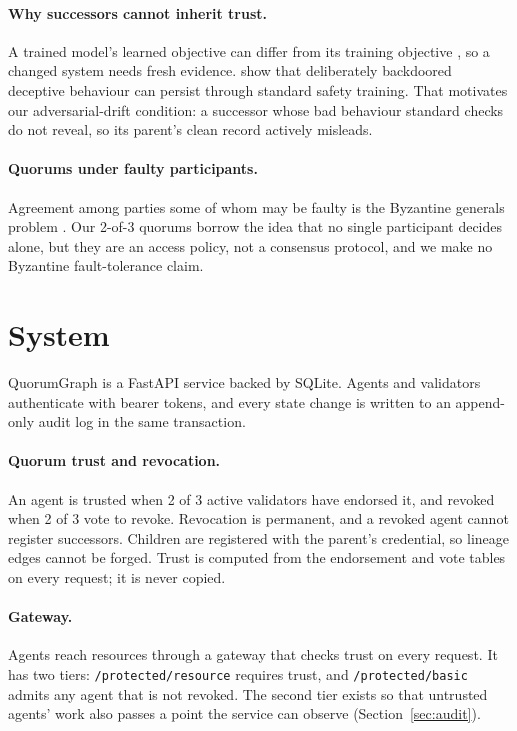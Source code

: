 \documentclass[11pt]{article}
\newcommand{\code}[1]{\texttt{#1}}
\begin{document}
\paragraph{Why successors cannot inherit trust.} A trained model's learned objective can
differ from its training objective \citep{hubinger2019risks}, so a changed system needs fresh
evidence. \citet{hubinger2024sleeper} show that deliberately backdoored deceptive behaviour
can persist through standard safety training. That motivates our adversarial-drift condition:
a successor whose bad behaviour standard checks do not reveal, so its parent's clean record
actively misleads.

\paragraph{Quorums under faulty participants.} Agreement among parties some of whom may be
faulty is the Byzantine generals problem \citep{lamport1982byzantine}. Our 2-of-3 quorums
borrow the idea that no single participant decides alone, but they are an access policy, not a
consensus protocol, and we make no Byzantine fault-tolerance claim.

\section{System}
\label{sec:system}

QuorumGraph is a FastAPI service backed by SQLite. Agents and validators authenticate with
bearer tokens, and every state change is written to an append-only audit log in the same
transaction.

\paragraph{Quorum trust and revocation.} An agent is trusted when 2 of 3 active validators
have endorsed it, and revoked when 2 of 3 vote to revoke. Revocation is permanent, and a
revoked agent cannot register successors. Children are registered with the parent's
credential, so lineage edges cannot be forged. Trust is computed from the endorsement and
vote tables on every request; it is never copied.

\paragraph{Gateway.} Agents reach resources through a gateway that checks trust on every
request. It has two tiers: \code{/protected/resource} requires trust, and
\code{/protected/basic} admits any agent that is not revoked. The second tier exists so that
untrusted agents' work also passes a point the service can observe (Section~\ref{sec:audit}).
\end{document}
